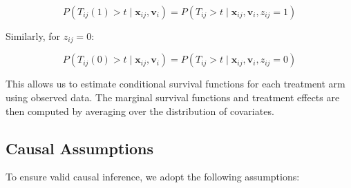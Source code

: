 \documentclass[useAMS,referee]{biom}
\begin{document}
\begin{equation}
P(T_{ij}(1) > t \mid \mathbf{x}_{ij}, \mathbf{v}_i) = P(T_{ij} > t \mid \mathbf{x}_{ij}, \mathbf{v}_i, z_{ij}=1)
\end{equation}

Similarly, for $z_{ij}=0$:

\begin{equation}
P(T_{ij}(0) > t \mid \mathbf{x}_{ij}, \mathbf{v}_i) = P(T_{ij} > t \mid \mathbf{x}_{ij}, \mathbf{v}_i, z_{ij}=0)
\end{equation}

This allows us to estimate conditional survival functions for each treatment arm using observed data. The marginal survival functions and treatment effects are then computed by averaging over the distribution of covariates.

\subsection{Causal Assumptions}

To ensure valid causal inference, we adopt the following assumptions:
\end{document}
